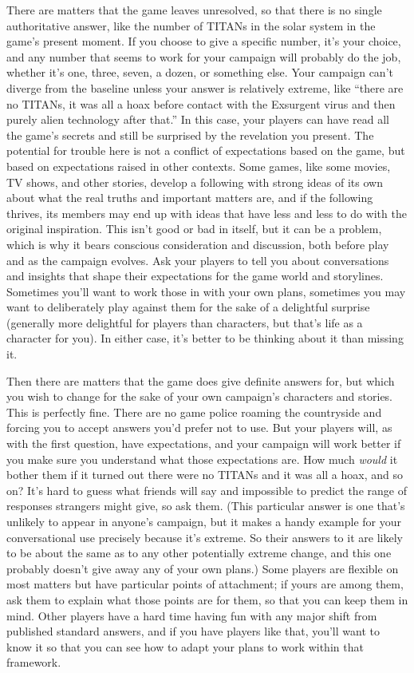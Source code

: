 There are matters that the game leaves unresolved, 
so that there is no single authoritative answer, like the 
number of TITANs in the solar system in the game's 
present moment. If you choose to give a specific 
number, it's your choice, and any number that seems 
to work for your campaign will probably do the job, 
whether it's one, three, seven, a dozen, or something 
else. Your campaign can't diverge from the baseline 
unless your answer is relatively extreme, like ``there 
are no TITANs, it was all a hoax before contact with 
the Exsurgent virus and then purely alien technology 
after that.'' In this case, your players can have read 
all the game's secrets and still be surprised by the revelation
you present. The potential for trouble here is
not a conflict of expectations based on the game, but 
based on expectations raised in other contexts. Some 
games, like some movies, TV shows, and other stories, 
develop a following with strong ideas of its own about 
what the real truths and important matters are, and if 
the following thrives, its members may end up with 
ideas that have less and less to do with the original 
inspiration. This isn't good or bad in itself, but it can 
be a problem, which is why it bears conscious consideration
and discussion, both before play and as the
campaign evolves. Ask your players to tell you about 
conversations and insights that shape their expectations
for the game world and storylines. Sometimes
you'll want to work those in with your own plans, 
sometimes you may want to deliberately play against 
them for the sake of a delightful surprise (generally 
more delightful for players than characters, but that's 
life as a character for you). In either case, it's better to 
be thinking about it than missing it. 

Then there are matters that the game does give 
definite answers for, but which you wish to change 
for the sake of your own campaign's characters and 
stories. This is perfectly fine. There are no game police 
roaming the countryside and forcing you to accept 
answers you'd prefer not to use. But your players 
will, as with the first question, have expectations, and 
your campaign will work better if you make sure you 
understand what those expectations are. How much 
\textit{would }it bother them if it turned out there were no 
TITANs and it was all a hoax, and so on? It's hard to 
guess what friends will say and impossible to predict 
the range of responses strangers might give, so ask 
them. (This particular answer is one that's unlikely to 
appear in anyone's campaign, but it makes a handy 
example for your conversational use precisely because 
it's extreme. So their answers to it are likely to be 
about the same as to any other potentially extreme 
change, and this one probably doesn't give away any 
of your own plans.) Some players are flexible on most 
matters but have particular points of attachment; 
if yours are among them, ask them to explain what 
those points are for them, so that you can keep them 
in mind. Other players have a hard time having fun 
with any major shift from published standard answers, 
and if you have players like that, you'll want to know 
it so that you can see how to adapt your plans to 
work within that framework. 


